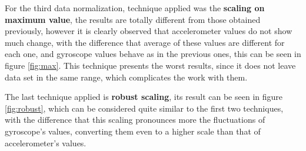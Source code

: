 \vspace{5mm} %

For the third data normalization, technique applied was the \textbf{scaling on maximum value}, the results are totally different from those obtained previously, however it is clearly observed that accelerometer values do not show much change, with the difference that average of these values are different for each one, and gyroscope values behave as in the previous ones, this can be seen in figure \ref{fig:max}. This technique presents the worst results, since it does not leave data set in the same range, which complicates the work with them.

\vspace{5mm} %

The last technique applied is \textbf{robust scaling}, its result can be seen in figure \ref{fig:robust}, which can be considered quite similar to the first two techniques, with the difference that this scaling pronounces more the fluctuations of gyroscope's values, converting them even to a higher scale than that of accelerometer's values.

\vspace{5mm} %

